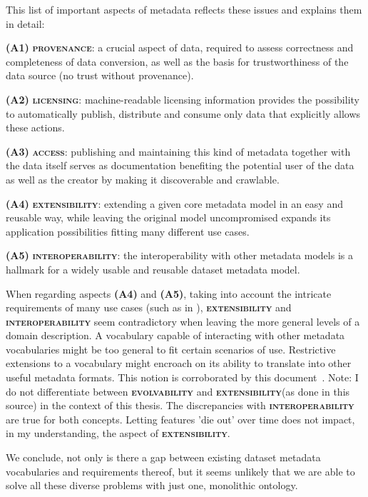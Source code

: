 \documentclass[a4paper,english,twoside,BCOR1.5cm,headsepline,DIV12,appendixprefix,final,12pt]{scrbook}
\newcommand{\provenance}{{\ttfamily\scshape\bfseries provenance}\xspace}
\newcommand{\licensing}{{\ttfamily\scshape\bfseries licensing}\xspace}
\newcommand{\access}{{\ttfamily\scshape\bfseries access}\xspace}
\newcommand{\extensibility}{{\ttfamily\scshape\bfseries extensibility}\xspace}
\newcommand{\interoperability}{{\ttfamily\scshape\bfseries interoperability}\xspace}
\newcommand{\evolvability}{{\ttfamily\scshape\bfseries evolvability}\xspace}
\newcommand{\odrl}{{\scshape\bfseries odrl}\xspace}
\begin{document}
This list of important aspects of metadata reflects these issues and explains them in detail:

\textbf{(A1)} \provenance: a crucial aspect of data, required to assess correctness and completeness of data conversion, as well as the basis for trustworthiness of the data source (no trust without provenance). 

\textbf{(A2)} \licensing: machine-readable licensing information provides the possibility to automatically
publish, distribute and consume only data that explicitly allows these actions. %

\textbf{(A3)} \access: publishing and maintaining
this kind of metadata together with the data itself serves as
documentation benefiting the potential user
of the data as well as the creator by making it discoverable
and crawlable. 

\textbf{(A4)} \extensibility: extending a given core metadata model
in an easy and reusable way, while leaving the original model uncompromised expands its application possibilities fitting many
different use cases. 

\textbf{(A5)} \interoperability: the interoperability with other metadata models is a hallmark for a widely usable and reusable dataset metadata model.

When regarding aspects \textbf{(A4)} and \textbf{(A5)}, taking into account the intricate requirements of many use cases (such as in ), \extensibility and \interoperability seem contradictory when leaving the more general levels of a domain description. A vocabulary capable of interacting with other metadata vocabularies might be too general to fit certain scenarios of use. Restrictive extensions to a vocabulary might encroach on its ability to translate into other useful metadata formats. This notion is corroborated by this document~\cite{ivse}. Note: I do not differentiate between \evolvability and \extensibility (as done in this source) in the context of this thesis. The discrepancies with \interoperability are true for both concepts. Letting features 'die out' over time does not impact, in my understanding, the aspect of \extensibility. 

We conclude, not only is there a gap between existing dataset metadata vocabularies and requirements thereof, but it seems unlikely that we are able to solve all these diverse problems with just one, monolithic ontology.
\end{document}
